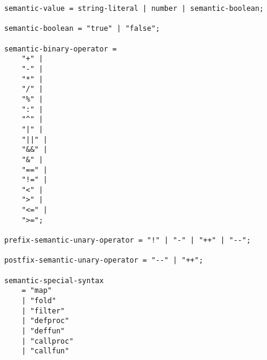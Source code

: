 \begin{lstlisting}
semantic-value = string-literal | number | semantic-boolean;

semantic-boolean = "true" | "false";

semantic-binary-operator = 
    "+" |
    "-" |
    "*" |
    "/" |
    "%" |
    ":" |
    "^" |
    "|" |
    "||" |
    "&&" |
    "&" |
    "==" |
    "!=" |
    "<" |
    ">" |
    "<=" |
    ">=";

prefix-semantic-unary-operator = "!" | "-" | "++" | "--";

postfix-semantic-unary-operator = "--" | "++";

semantic-special-syntax 
    = "map"
    | "fold"
    | "filter"
    | "defproc"
    | "deffun"
    | "callproc"
    | "callfun"
\end{lstlisting}

